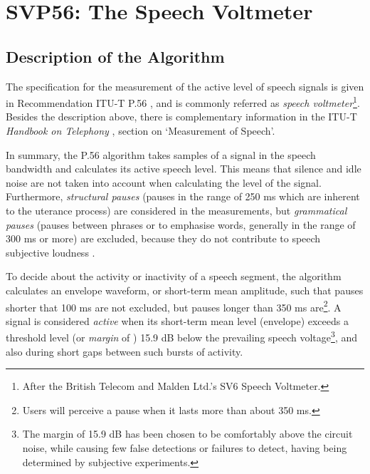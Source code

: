 \chapter{SVP56: The Speech Voltmeter}

\section{Description of the Algorithm}

The specification for the measurement of the active level of speech
signals is given in Recommendation ITU-T P.56
\cite{P.56}\textcolor{blue}{\cite{P.56-rev}}, and is commonly referred as {\em speech
  voltmeter}\footnote{\SF After the British Telecom and Malden Ltd.'s
  SV6 Speech Voltmeter.}. Besides the description above, there is
complementary information in the ITU-T {\em Handbook on Telephony}
\cite{Hndbk-tel}, section on `Measurement of Speech'.

In summary, the P.56 algorithm takes samples of a signal in the speech
bandwidth and calculates its active speech level. This means that
silence and idle noise are not taken into account when calculating the
level of the signal. Furthermore, {\it structural pauses} (pauses in
the range of 250 ms which are inherent to the uterance process) are
considered in the measurements, but {\em grammatical pauses} (pauses between
phrases or to emphasise words, generally in the range of 300 ms or
more) are excluded, because they do not contribute to speech
subjective loudness \cite{Hndbk-tel}.

To decide about the activity or inactivity of a speech segment, the
algorithm calculates an envelope waveform, or short-term mean
amplitude, such that pauses shorter that 100 ms are not excluded, but
pauses longer than 350 ms are\footnote{\SF Users will perceive a pause when it
lasts more than about 350 ms.}. A signal is considered {\em active}
when its short-term mean level (envelope) exceeds a threshold level
(or {\em margin} of ) 15.9 dB below the prevailing speech
voltage\footnote{\SF The margin of 15.9 dB has been chosen to be
comfortably above the circuit noise, while causing few false detections
or failures to detect, having being determined by subjective
experiments.}, and also during short gaps between such bursts of
activity.

